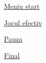 
\begin{DoxyItemize}
\item \hyperlink{group__group__meniu__start}{Meniu start}
\item \hyperlink{group__group__jocul__efectiv}{Jocul efectiv}
\item \hyperlink{group__group__pauza}{Pauza}
\item \hyperlink{group__group__final}{Final} 
\end{DoxyItemize}